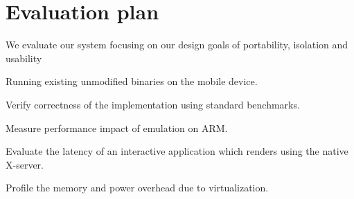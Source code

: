 \section{Evaluation plan}
We evaluate our system focusing on our design goals of portability, isolation and usability
	\begin{itemize*}
	\item Running existing unmodified binaries on the mobile device.
	\item Verify correctness of the implementation using standard benchmarks.
	\item Measure performance impact of emulation on ARM.
	\item Evaluate the latency of an interactive application which renders using the native X-server.
  \item Profile the memory and power overhead due to virtualization.
	\end{itemize*}
